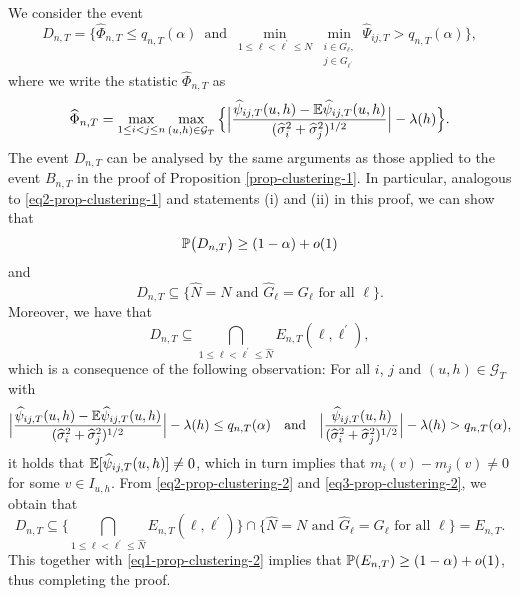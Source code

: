 We consider the event
\[ D_{n,T} = \Big\{ \widehat{\Phi}_{n,T} \le q_{n,T}(\alpha) \, \text{ and } \,  \min_{1 \le \ell < \ell^\prime \le N} \min_{\substack{i \in G_\ell, \\ j \in G_{\ell^\prime}}} \widehat{\Psi}_{ij,T} > q_{n,T}(\alpha) \Big\}, \]
where we write the statistic $\widehat{\Phi}_{n,T}$ as
\[ \widehat{\Phi}_{n,T} = \max_{1 \le i < j \le n} \max_{(u,h) \in \mathcal{G}_T} \Big\{ \Big| \frac{\widehat{\psi}_{ij,T}(u,h)- \mathbb{E} \widehat{\psi}_{ij,T}(u,h)} {(\widehat{\sigma}_i^2 + \widehat{\sigma}_j^2)^{1/2}} \Big| - \lambda(h) \Big \}. \]
The event $D_{n,T}$ can be analysed by the same arguments as those applied to the event $B_{n,T}$ in the proof of Proposition \ref{prop-clustering-1}. In particular, analogous to \eqref{eq2-prop-clustering-1} and statements (i) and (ii) in this proof, we can show that
\begin{equation}\label{eq1-prop-clustering-2}
\mathbb{P} \big( D_{n,T} \big) \ge (1-\alpha) + o(1)
\end{equation}
and 
\begin{equation}\label{eq2-prop-clustering-2}
D_{n,T} \subseteq \big\{ \widehat{N} = N \text{ and } \widehat{G}_\ell = G_\ell \text{ for all } \ell \big\}.
\end{equation}
Moreover, we have that
\begin{equation}\label{eq3-prop-clustering-2}
D_{n,T} \subseteq \bigcap_{1 \le \ell < \ell^\prime \le \widehat{N}} E_{n,T}(\ell,\ell^\prime),
\end{equation}
which is a consequence of the following observation: For all $i$, $j$ and $(u,h) \in \mathcal{G}_T$ with 
\[ \Big|\frac{\widehat{\psi}_{ij,T}(u,h) - \mathbb{E} \widehat{\psi}_{ij,T}(u,h)}{(\widehat{\sigma}_i^2 + \widehat{\sigma}_j^2)^{1/2}}\Big| - \lambda(h) \le q_{n,T}(\alpha) \quad \text{and} \quad \Big|\frac{\widehat{\psi}_{ij,T}(u,h)}{(\widehat{\sigma}_i^2 + \widehat{\sigma}_j^2)^{1/2}}\Big| - \lambda(h) > q_{n,T}(\alpha), \]
it holds that $\mathbb{E}[\widehat{\psi}_{ij,T}(u,h)] \ne 0$, which in turn implies that $m_i(v) - m_j(v) \ne 0$ for some $v \in I_{u,h}$. From \eqref{eq2-prop-clustering-2} and \eqref{eq3-prop-clustering-2}, we obtain that 
\[ D_{n,T} \subseteq \Big\{ \bigcap_{1 \le \ell < \ell^\prime \le \widehat{N}} E_{n,T}(\ell,\ell^\prime) \Big\} \cap \big\{ \widehat{N} = N \text{ and } \widehat{G}_\ell = G_\ell \text{ for all } \ell \big\} = E_{n,T}. \] 
This together with \eqref{eq1-prop-clustering-2} implies that $\mathbb{P}(E_{n,T}) \ge (1-\alpha) + o(1)$, thus completing the proof. 



